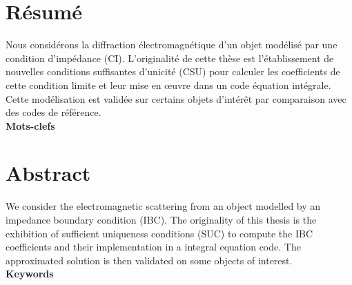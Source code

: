 \thispagestyle{empty}
\begin{center}
\Large
\textbf{\doctitlefr}
\end{center}
\section*{Résumé}
Nous considérons la diffraction électromagnétique d'un objet modélisé par une condition d'impédance (CI). L'originalité de cette thèse est l'établissement de nouvelles conditions suffisantes d'unicité (CSU) pour calculer les coefficients de cette condition limite et leur mise en œuvre dans un code équation intégrale. Cette modélisation est validée sur certains objets d'intérêt par comparaison avec des codes de référence.
\\

\textbf{Mots-clefs}


\dockeywordsfr

\hrulefill
\begin{center}
\Large
\textbf{\doctitleeng}
\end{center}
\section*{Abstract}
We consider the electromagnetic scattering from an object modelled by an impedance boundary condition (IBC). The originality of this thesis is the exhibition of sufficient uniqueness conditions (SUC) to compute the IBC coefficients and their implementation in a integral equation code. The approximated solution is then validated on some objects of interest.
\\

\textbf{Keywords}


\dockeywordseng
